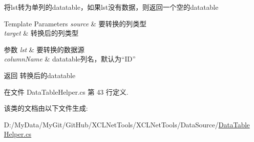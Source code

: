 将lst转为单列的datatable，如果lst没有数据，则返回一个空的datatable 


\begin{DoxyTemplParams}{Template Parameters}
{\em source} & 要转换的列类型\\
\hline
{\em target} & 转换后的列类型\\
\hline
\end{DoxyTemplParams}

\begin{DoxyParams}{参数}
{\em lst} & 要转换的数据源\\
\hline
{\em column\-Name} & datatable列名，默认为“\-I\-D”\\
\hline
\end{DoxyParams}
\begin{DoxyReturn}{返回}
转换后的datatable
\end{DoxyReturn}


在文件 Data\-Table\-Helper.\-cs 第 43 行定义.



该类的文档由以下文件生成\-:\begin{DoxyCompactItemize}
\item 
D\-:/\-My\-Data/\-My\-Git/\-Git\-Hub/\-X\-C\-L\-Net\-Tools/\-X\-C\-L\-Net\-Tools/\-Data\-Source/\hyperlink{_data_table_helper_8cs}{Data\-Table\-Helper.\-cs}\end{DoxyCompactItemize}
